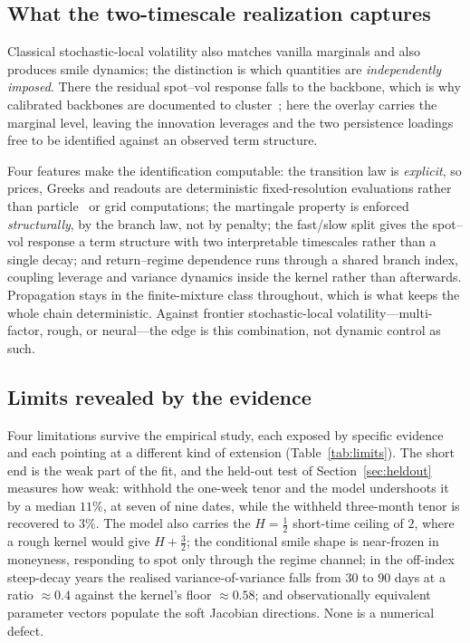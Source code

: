 \documentclass[11pt]{article}
\providecommand{\1}{\mathbf 1}
\begin{document}
\subsection{What the two-timescale realization captures}

Classical stochastic-local volatility also matches vanilla marginals and also produces smile
dynamics; the distinction is which quantities are \emph{independently imposed}. There the residual
spot--vol response falls to the backbone, which is why calibrated backbones are documented to
cluster~\cite{bergomi2017}; here the overlay carries the marginal level, leaving the
innovation leverages and the two persistence loadings free to be identified against an observed
term structure.

Four features make the identification computable: the transition law is \emph{explicit}, so prices,
Greeks and readouts are deterministic fixed-resolution evaluations rather than
particle~\cite{guyonhl2012} or grid computations; the martingale
property is enforced \emph{structurally}, by the branch law, not by penalty; the fast/slow split
gives the spot--vol response a term structure with two interpretable timescales rather than a single
decay; and return--regime dependence runs through a shared branch index, coupling leverage and
variance dynamics inside the kernel rather than afterwards. Propagation stays in the finite-mixture
class throughout, which is what keeps the whole chain deterministic. Against frontier
stochastic-local volatility---multi-factor, rough, or neural---the edge is this combination, not
dynamic control as such.

\subsection{Limits revealed by the evidence}

Four limitations survive the empirical study, each exposed by specific evidence and each pointing at
a different kind of extension (Table~\ref{tab:limits}). The short end is the weak part of the fit,
and the held-out test of Section~\ref{sec:heldout} measures how weak: withhold the one-week tenor
and the model undershoots it by a median $11\%$, at seven of nine dates, while the withheld
three-month tenor is recovered to $3\%$. The model also carries the
$H{=}\tfrac12$ short-time ceiling of $2$, where a rough kernel would give $H{+}\tfrac32$; the conditional smile shape is
near-frozen in moneyness, responding to spot only through the regime channel; in the off-index
steep-decay years the realised variance-of-variance falls from $30$ to $90$ days at a ratio
${\approx}0.4$ against the kernel's floor ${\approx}0.58$; and observationally equivalent parameter
vectors populate the soft Jacobian directions. None is a numerical defect.
\end{document}
